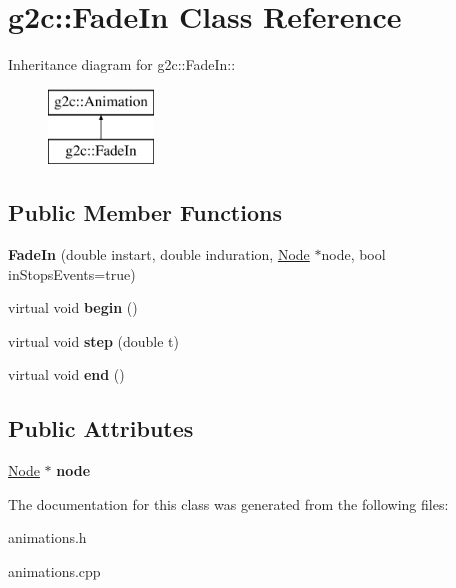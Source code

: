 \hypertarget{classg2c_1_1_fade_in}{
\section{g2c::FadeIn Class Reference}
\label{classg2c_1_1_fade_in}
}
Inheritance diagram for g2c::FadeIn::\begin{figure}[H]
\begin{center}
\leavevmode
\includegraphics[height=2cm]{classg2c_1_1_fade_in}
\end{center}
\end{figure}
\subsection*{Public Member Functions}
\begin{DoxyCompactItemize}
\item 
\hypertarget{classg2c_1_1_fade_in_aa4692c7057e12566f994852da29d62ea}{
{\bfseries FadeIn} (double instart, double induration, \hyperlink{classg2c_1_1_node}{Node} $\ast$node, bool inStopsEvents=true)}
\label{classg2c_1_1_fade_in_aa4692c7057e12566f994852da29d62ea}

\item 
\hypertarget{classg2c_1_1_fade_in_ae175bff38735f9623785e967d2c6f89d}{
virtual void {\bfseries begin} ()}
\label{classg2c_1_1_fade_in_ae175bff38735f9623785e967d2c6f89d}

\item 
\hypertarget{classg2c_1_1_fade_in_a74f9cb7931f6467b57ffcae832f717a1}{
virtual void {\bfseries step} (double t)}
\label{classg2c_1_1_fade_in_a74f9cb7931f6467b57ffcae832f717a1}

\item 
\hypertarget{classg2c_1_1_fade_in_aae92e1974d3ceb722236a8210971280a}{
virtual void {\bfseries end} ()}
\label{classg2c_1_1_fade_in_aae92e1974d3ceb722236a8210971280a}

\end{DoxyCompactItemize}
\subsection*{Public Attributes}
\begin{DoxyCompactItemize}
\item 
\hypertarget{classg2c_1_1_fade_in_ab62d93a61763af15b0bc322c7a9b8475}{
\hyperlink{classg2c_1_1_node}{Node} $\ast$ {\bfseries node}}
\label{classg2c_1_1_fade_in_ab62d93a61763af15b0bc322c7a9b8475}

\end{DoxyCompactItemize}


The documentation for this class was generated from the following files:\begin{DoxyCompactItemize}
\item 
animations.h\item 
animations.cpp\end{DoxyCompactItemize}
